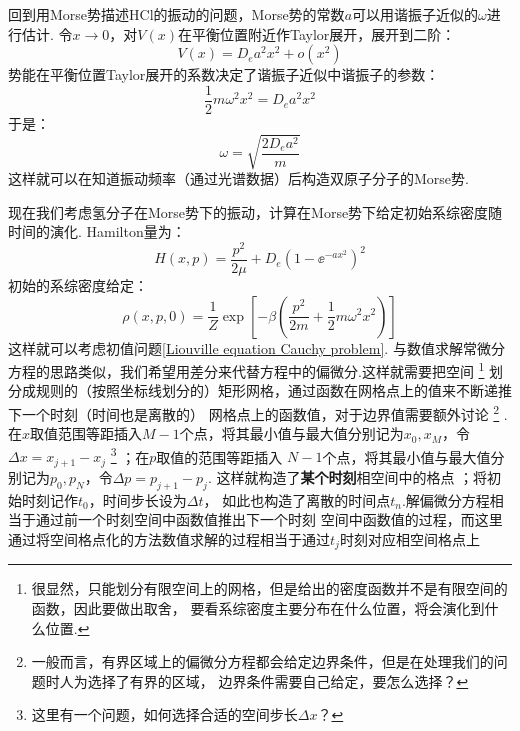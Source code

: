     回到用Morse势描述HCl的振动的问题，Morse势的常数$a$可以用谐振子近似的$\omega$进行估计.
    令$x \to 0 $，对$V(x)$在平衡位置附近作Taylor展开，展开到二阶：
    \begin{equation}
        V(x) = D_e a^2 x^2 + o(x^2)
    \end{equation}
    势能在平衡位置Taylor展开的系数决定了谐振子近似中谐振子的参数：
    \begin{equation}
        \frac 12 m\omega^2x^2 = D_e a^2 x^2
    \end{equation}
    于是：
    \begin{equation}
        \omega = \sqrt{\frac {2D_ea^2}m}
        \label{omega of Morse}
    \end{equation}
    这样就可以在知道振动频率（通过光谱数据）后构造双原子分子的Morse势.
    \par 
    现在我们考虑氢分子在Morse势下的振动，计算在Morse势下给定初始系综密度随时间的演化.
    Hamilton量为：
    \begin{equation}
        H(x, p) = \frac{p^2}{2\mu} + D_e(1-\ee^{-ax^2})^2
    \end{equation}
    初始的系综密度给定：
    \begin{equation}
        \rho(x, p, 0) = \frac{1}{Z}\exp\left[-\beta\left(\frac{p^2}{2m} + \frac{1}{2}m\omega^2x^2\right)\right]
    \end{equation}
    这样就可以考虑初值问题\ref{Liouville equation Cauchy problem}.
    与数值求解常微分方程的思路类似，我们希望用差分来代替方程中的偏微分.这样就需要把空间
    \footnote{
        很显然，只能划分有限空间上的网格，但是给出的密度函数并不是有限空间的函数，因此要做出取舍，
        要看系综密度主要分布在什么位置，将会演化到什么位置.
    }
    划分成规则的（按照坐标线划分的）矩形网格，通过函数在网格点上的值来不断递推下一个时刻（时间也是离散的）
    网格点上的函数值，对于边界值需要额外讨论
    \footnote{
        一般而言，有界区域上的偏微分方程都会给定边界条件，但是在处理我们的问题时人为选择了有界的区域，
        边界条件需要自己给定，要怎么选择？
    }
    .
    在$x$取值范围等距插入$M-1$个点，将其最小值与最大值分别记为$x_0, x_M$，令$\Delta x = x_{j+1} - x_j$
    \footnote{
        这里有一个问题，如何选择合适的空间步长$\Delta x$？
    }
    ；在$p$取值的范围等距插入
    $N-1$个点，将其最小值与最大值分别记为$p_0, p_N$，令$\Delta p = p_{j + 1} - p_j$.
    这样就构造了\textbf{某个时刻}相空间中的格点
    ；将初始时刻记作$t_0$，时间步长设为$\Delta t$，
    如此也构造了离散的时间点$t_n$.解偏微分方程相当于通过前一个时刻空间中函数值推出下一个时刻
    空间中函数值的过程，而这里通过将空间格点化的方法数值求解的过程相当于通过$t_j$时刻对应相空间格点上
